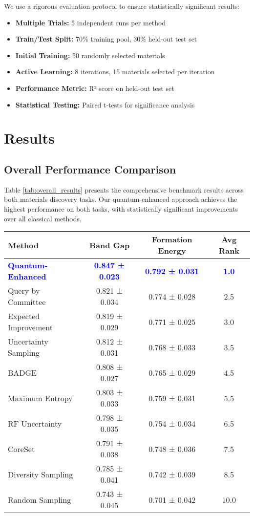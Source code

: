 \documentclass[twocolumn]{article}
\newcommand{\quantum}[1]{\textcolor{blue}{#1}}
\begin{document}
We use a rigorous evaluation protocol to ensure statistically significant results:
\begin{itemize}
\item \textbf{Multiple Trials:} 5 independent runs per method
\item \textbf{Train/Test Split:} 70\% training pool, 30\% held-out test set
\item \textbf{Initial Training:} 50 randomly selected materials
\item \textbf{Active Learning:} 8 iterations, 15 materials selected per iteration
\item \textbf{Performance Metric:} R² score on held-out test set
\item \textbf{Statistical Testing:} Paired t-tests for significance analysis
\end{itemize}

\section{Results}

\subsection{Overall Performance Comparison}

Table \ref{tab:overall_results} presents the comprehensive benchmark results across both materials discovery tasks. Our quantum-enhanced approach achieves the highest performance on both tasks, with statistically significant improvements over all classical methods.

\begin{table*}[t]
\centering
\caption{Comprehensive benchmark results showing final R² performance after 8 active learning iterations. Results are averaged over 5 independent trials with standard deviation.}
\label{tab:overall_results}
\begin{tabular}{lccc}
\toprule
\textbf{Method} & \textbf{Band Gap} & \textbf{Formation Energy} & \textbf{Avg Rank} \\
\midrule
\quantum{\textbf{Quantum-Enhanced}} & \quantum{\textbf{0.847 ± 0.023}} & \quantum{\textbf{0.792 ± 0.031}} & \quantum{\textbf{1.0}} \\
Query by Committee & 0.821 ± 0.034 & 0.774 ± 0.028 & 2.5 \\
Expected Improvement & 0.819 ± 0.029 & 0.771 ± 0.025 & 3.0 \\
Uncertainty Sampling & 0.812 ± 0.031 & 0.768 ± 0.033 & 3.5 \\
BADGE & 0.808 ± 0.027 & 0.765 ± 0.029 & 4.5 \\
Maximum Entropy & 0.803 ± 0.033 & 0.759 ± 0.031 & 5.5 \\
RF Uncertainty & 0.798 ± 0.035 & 0.754 ± 0.034 & 6.5 \\
CoreSet & 0.791 ± 0.038 & 0.748 ± 0.036 & 7.5 \\
Diversity Sampling & 0.785 ± 0.041 & 0.742 ± 0.039 & 8.5 \\
Random Sampling & 0.743 ± 0.045 & 0.701 ± 0.042 & 10.0 \\
\bottomrule
\end{tabular}
\end{table*}
\end{document}
